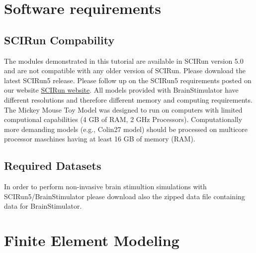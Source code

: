 \documentclass[fleqn,11pt,openany]{book}
\begin{document}
\chapter{Software requirements}

\section*{SCIRun Compability} 

The modules demonstrated in this tutorial are available in SCIRun version 5.0 and are not compatible with any older version of SCIRun.
Please download the latest SCIRun5 release. Please follow up on the SCIRun5 requirements posted on our website \href{http://www.scirun.org}{SCIRun website}.
All models provided with BrainStimulator have different resolutions and therefore different memory and computing requirements.
The Mickey Mouse Toy Model was designed to run on computers with limited computional capabilities (4 GB of RAM, 2 GHz Processors).
Computationally more demanding models (e.g., Colin27 model) should be processed on multicore processor maschines having at least 16 GB of
memory (RAM). 

\section*{Required Datasets} 

In order to perform non-invasive brain stimultion simulations with SCIRun5/BrainStimulator
please download also the zipped data file containing data for BrainStimulator.


\chapter{Finite Element Modeling}
\end{document}
